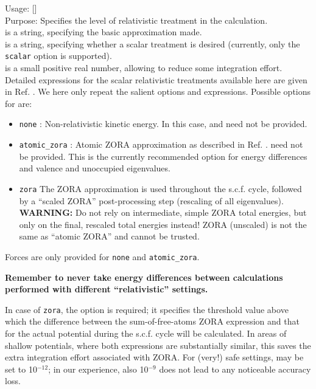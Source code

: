 {
  \noindent
  Usage:   
    [] \\[1.0ex]
  Purpose: Specifies the level of relativistic treatment in the
    calculation. \\[1.0ex]
   is a string, specifying the basic approximation
    made. \\
   is a string, specifying whether a scalar treatment
    is desired (currently, only the \texttt{scalar} option is
    supported). \\ 
   is a small positive real number, allowing to
    reduce some integration effort. \\
}
Detailed expressions for the scalar relativistic treatments available
here are given in Ref. \cite{Blum08}. We here only repeat the salient
options and expressions. Possible options for  are:
\begin{itemize}
  \item \texttt{none} : Non-relativistic kinetic energy. In this case,
         and  need not be provided. 
  \item \texttt{atomic\_zora} : Atomic ZORA approximation as described
    in Ref. \cite{Blum08}.  need not be provided. 
    This is the currently recommended option for energy differences and valence 
    and unoccupied eigenvalues.
  \item \texttt{zora} The ZORA approximation is used throughout the
    s.c.f. cycle, followed by a ``scaled ZORA'' \cite{Lenthe94} post-processing step
    (rescaling of all eigenvalues). \textbf{WARNING:} Do not rely on
    intermediate, simple ZORA total energies, but only on the final,
    rescaled total energies instead! ZORA (unscaled) is not the same as 
    ``atomic ZORA'' and cannot be trusted.
\end{itemize}
Forces are only provided for \texttt{none} and \texttt{atomic\_zora}.

\textbf{Remember to never take energy differences between calculations
  performed with different ``relativistic'' settings.}

In case of \texttt{zora}, the  option is required;
it specifies the threshold value above which the difference between
the sum-of-free-atoms ZORA expression and that for the actual
potential during the s.c.f. cycle will be calculated. In areas of
shallow potentials, where both expressions are substantially similar,
this saves the extra integration effort associated with ZORA. For
(very!) safe settings,  may be set to 10$^{-12}$; in
our experience, also 10$^{-9}$ does not lead to any noticeable
accuracy loss. 

